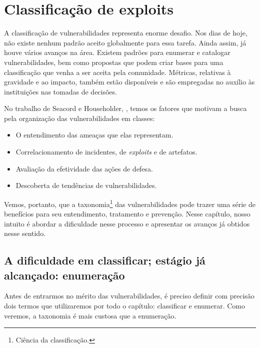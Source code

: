 
\chapter{Classificação de exploits}
\label{chap:classificacao}

	A classificação de vulnerabilidades representa enorme desafio.
	Nos dias de hoje, não existe nenhum padrão aceito globalmente para essa tarefa.
	Ainda assim, já houve vários avanços na área. 
	Existem padrões para enumerar e catalogar vulnerabilidades, bem como propostas
	que podem criar bases para uma classificação que venha a ser aceita pela comunidade.
	Métricas, relativas	à gravidade e ao impacto, também estão disponíveis
	e são empregadas no auxílio às instituições nas tomadas	de decisões.

	
	No trabalho de Seacord e Householder, \cite{Seacord2005}, temos os fatores que motivam a
	busca pela organização das vulnerabilidades em classes:
	\begin{itemize}
		\item{O entendimento das ameaças que elas representam.}
		\item{Correlacionamento de incidentes, de \textsl{exploits} e de artefatos.}
		\item{Avaliação da efetividade das ações de defesa.}
		\item{Descoberta de tendências de vulnerabilidades.}
	\end{itemize}

	
	Vemos, portanto, que a taxonomia\footnote{Ciência da classificação.} das vulnerabilidades
	pode trazer uma série de benefícios para seu entendimento, tratamento e prevenção.
	Nesse capítulo, nosso intuito é abordar a dificuldade nesse processo e apresentar
	os avanços já obtidos nesse sentido.  


	\section{A dificuldade em classificar; estágio já alcançado: enumeração}
		Antes de entrarmos no mérito das vulnerabilidades, é preciso definir
		com precisão dois termos que utilizaremos por todo o capítulo: classificar e enumerar.
		Como veremos, a taxonomia é mais custosa que a enumeração.

